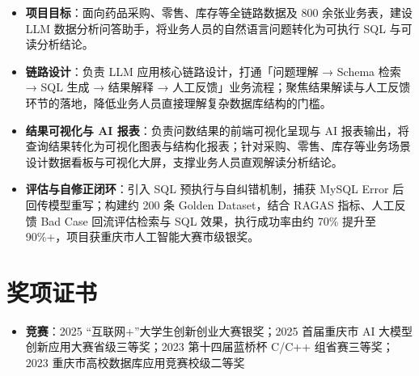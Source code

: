 \documentclass[10pt]{article}
\begin{document}
    \vspace{0.18em}

    \begin{itemize}
        \item \textbf{项目目标}：面向药品采购、零售、库存等全链路数据及 800 余张业务表，建设 LLM 数据分析问答助手，将业务人员的自然语言问题转化为可执行 SQL 与可读分析结论。
        \item \textbf{链路设计}：负责 LLM 应用核心链路设计，打通「问题理解 → Schema 检索 → SQL 生成 → 结果解释 → 人工反馈」业务流程；聚焦结果解读与人工反馈环节的落地，降低业务人员直接理解复杂数据库结构的门槛。
        \item \textbf{结果可视化与 AI 报表}：负责问数结果的前端可视化呈现与 AI 报表输出，将查询结果转化为可视化图表与结构化报表；针对采购、零售、库存等业务场景设计数据看板与可视化大屏，支撑业务人员直观解读分析结论。
        \item \textbf{评估与自修正闭环}：引入 SQL 预执行与自纠错机制，捕获 MySQL Error 后回传模型重写；构建约 200 条 Golden Dataset，结合 RAGAS 指标、人工反馈 Bad Case 回流评估检索与 SQL 效果，执行成功率由约 70\% 提升至 90\%+，项目获重庆市人工智能大赛市级银奖。
    \end{itemize}



    \section[奖项证书]{\makebox[\iconwidth][c]{\color{primarycolor}{\faTrophy}}\quad 奖项证书}
    \begin{itemize}
        \item \textbf{竞赛}：2025 “互联网+”大学生创新创业大赛银奖；2025 首届重庆市 AI 大模型创新应用大赛省级三等奖；2023 第十四届蓝桥杯 C/C++ 组省赛三等奖；2023 重庆市高校数据库应用竞赛校级二等奖
    \end{itemize}
\end{document}
